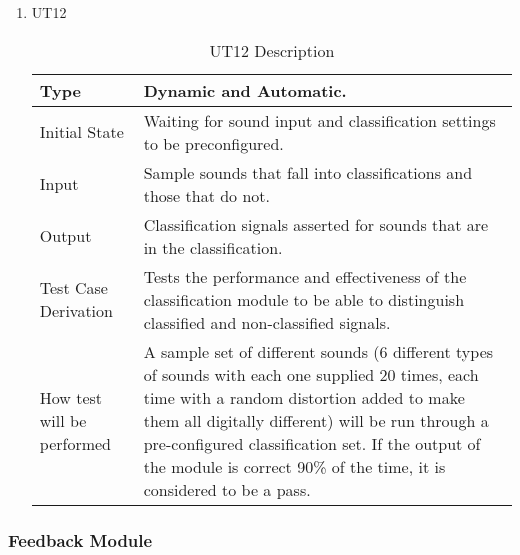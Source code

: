 \documentclass[12pt, titlepage]{article}
\begin{document}
\begin{enumerate}

\item{UT12}
\begin{table}[H]
    \caption{UT12 Description}
\begin{tabular}{ |p{5cm}||p{7cm}| }
    \hline
    Type & Dynamic and Automatic. \\
    \hline
    Initial State  &  Waiting for sound input and classification settings to be preconfigured. \\
    \hline
    Input &   Sample sounds that fall into classifications and those that do not. \\
    \hline
    Output &   Classification signals asserted for sounds that are in the classification.  \\
    \hline
    Test Case Derivation &   Tests the performance and effectiveness of the classification module to be able to distinguish classified and non-classified signals. \\
    \hline
    How test will be performed & A sample set of different sounds (6 different types of sounds with each one supplied 20 times, each time with a random distortion added to make them all digitally different) will be run through a pre-configured classification set. If the output of the module is correct 90\% of the time, it is considered to be a pass. \\
    \hline
\end{tabular}
\end{table}
\end{enumerate}


\subsubsection{Feedback Module}
\end{document}
